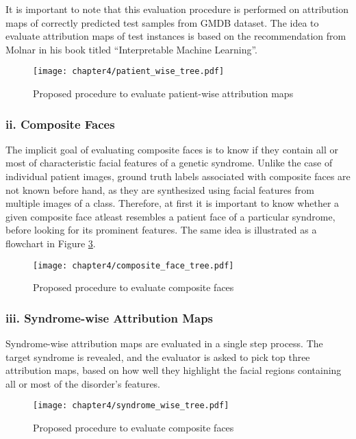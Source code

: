 \documentclass[../report.tex]{subfiles}
\begin{document}
    It is important to note that this evaluation procedure is performed on attribution maps of correctly predicted test samples from GMDB dataset. The idea to evaluate attribution maps of test instances is based on the recommendation from Molnar in his book titled \enquote{Interpretable Machine Learning}\cite{molnar2019}.
    
     \begin{figure}[H]
     	\hspace*{1cm}    
    	\texttt{[image: chapter4/patient\_wise\_tree.pdf]}
    	\vspace*{1cm}
   	    \caption{Proposed procedure to evaluate patient-wise attribution maps}
		\label{fig_patient_flow}
    \end{figure}

	\subsubsection{ii. Composite Faces}
	The implicit goal of evaluating composite faces is to know if they contain all or most of characteristic facial features of a genetic syndrome. Unlike the case of individual patient images, ground truth labels associated with composite faces are not known before hand, as they are synthesized using facial features from multiple images of a class. Therefore, at first it is important to know whether a given composite face atleast resembles a patient face of a particular syndrome, before looking for its prominent features. The same idea is illustrated as a flowchart in Figure \ref{fig_composite_flow}. 
	
	\begin{figure}[H]
		\hspace*{1cm}      
		\texttt{[image: chapter4/composite\_face\_tree.pdf]}
		\vspace*{4cm}
		\caption{Proposed procedure to evaluate composite faces}
		\label{fig_composite_flow}	
	\end{figure}

	\subsubsection{iii. Syndrome-wise Attribution Maps}
	Syndrome-wise attribution maps are evaluated in a single step process. The target syndrome is revealed, and the evaluator is asked to pick top three attribution maps, based on how well they highlight the facial regions containing all or most of the disorder's features.
	
	
	\begin{figure}[H]
		\hspace*{4.5cm}      
		\texttt{[image: chapter4/syndrome\_wise\_tree.pdf]}
		\caption{Proposed procedure to evaluate composite faces}
		\label{fig_composite_flow}	
	\end{figure}
\end{document}
